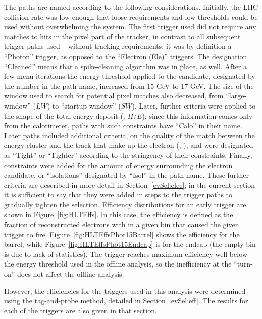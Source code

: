 The paths are named according to the following considerations.  
Initially, the LHC collision rate was low enough that loose 
requirements and low thresholds could be used without 
overwhelming the system.  
The first trigger used did not require any matches to 
hits in the pixel part of the tracker, 
in contrast to all subsequent trigger paths used -- 
without tracking requirements, it was by definition a 
``Photon'' trigger, 
as opposed to the ``Electron (Ele)'' triggers.  
The designation ``Cleaned'' means that a spike-cleaning 
algorithm was in place, as well.  
After a few menu iterations 
the energy threshold applied to the candidate, 
designated by the number in the path name,  
increased from 15 GeV to 17 GeV.  
The size of the window used to search for potential pixel 
matches also decreased, from ``large-window'' ($LW$) 
to ``startup-window'' ($SW$). %
Later, further criteria were applied to 
the shape of the total energy deposit (\sieie, $H/E$); %
since this information comes only from the calorimeter, 
paths with such constraints have ``Calo'' in their name.  
Later paths included additional criteria, 
on the quality of the match between the energy cluster and the track 
that make up the electron (\detain, \dphiin), 
and were designated as ``Tight'' or ``Tighter'' according 
to the stringency of their constraints.  
Finally, constraints were added for the amount of energy surrounding 
the electron candidate, or ``isolations'' 
designated by ``Isol'' in the path name.  
These further criteria are described in more detail in 
Section~\ref{evSel:elec}; 
in the current section it is sufficient to say that they 
were added in steps to the trigger paths to gradually tighten the 
selection.  
Efficiency distributions for an early trigger are shown 
in Figure~\ref{fig:HLTEffs}.  
In this case, the efficiency is defined as the fraction of reconstructed electrons
with \Et in a given bin that caused the given trigger to fire. 
Figure~\ref{fig:HLTEffsPhot15Barrel} shows the efficiency for 
the barrel, 
while Figure~\ref{fig:HLTEffsPhot15Endcap} is for the endcap 
(the empty bin is due to lack of statistics).  
The trigger reaches maximum efficiency well below the energy 
threshold used in the offline analysis, 
so the inefficiency at the ``turn-on'' does not affect the offline analysis.  

However, the efficiencies for the triggers used in this analysis 
were determined using the tag-and-probe method, detailed in 
Section~\ref{evSel:eff}.  
The results for each of the triggers are also 
given in that section.  

